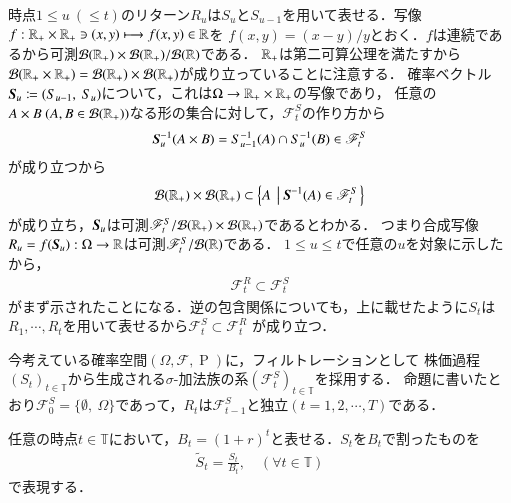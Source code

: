 \begin{prf}
	時点$1 \leq u\ (\leq t)$のリターン$R_u$は$S_u$と$S_{u-1}$を用いて表せる．写像$f: \mathbb{R}_+ \times \mathbb{R}_+ \ni (x,y) \longmapsto f(x,y) \in \mathbb{R}$を
	$f(x,y) = (x-y) / y$とおく．$f$は連続であるから可測$\mathcal{B}(\mathbb{R}_+) \times \mathcal{B}(\mathbb{R}_+)/\mathcal{B}(\mathbb{R})$である．
	$\mathbb{R}_+$は第二可算公理を満たすから$\mathcal{B}(\mathbb{R}_+ \times \mathbb{R}_+) = \mathcal{B}(\mathbb{R}_+) \times \mathcal{B}(\mathbb{R}_+)$が成り立っていることに注意する．
	確率ベクトル$\Vector{S}_u \coloneqq (S_{u-1},\ S_u)$について，これは$\Omega \rightarrow \mathbb{R}_+ \times \mathbb{R}_+$の写像であり，
	任意の$A \times B\ (A, B \in \mathcal{B}(\mathbb{R}_+))$なる形の集合に対して，$\mathscr{F}_t^S$の作り方から
	\begin{align}
		\mbox{\boldmath $S$}_u^{-1}(A \times B) = S_{u-1}^{-1}(A) \cap S_u^{-1}(B) \in \mathscr{F}_t^S
	\end{align}
	が成り立つから
	\begin{align}
		\borel{\R_+} \times \borel{\R_+} \subset \left\{A\ \left|\ \Vector{S}^{-1}(A) \in \mathscr{F}_t^S\right.\right\}
	\end{align}
	が成り立ち，$\mbox{\boldmath $S$}_u$は可測$\mathscr{F}_t^S/\mathcal{B}(\mathbb{R}_+) \times \mathcal{B}(\mathbb{R}_+)$であるとわかる．
	つまり合成写像$R_u = f(\mbox{\boldmath $S$}_u):\Omega \rightarrow \mathbb{R}$は可測$\mathscr{F}_t^S/\mathcal{B}(\mathbb{R})$である．
	$1 \leq u \leq t$で任意の$u$を対象に示したから，
	\begin{align}
		\mathscr{F}_t^R \subset \mathscr{F}_t^S
	\end{align}
	がまず示されたことになる．逆の包含関係についても，上に載せたように$S_t$は$R_1,\cdots,R_t$を用いて表せるから$\mathscr{F}_t^S \subset \mathscr{F}_t^R$
	が成り立つ．
	\QED
\end{prf}

\begin{asm}[フィルトレーション]
	今考えている確率空間$(\Omega, \mathscr{F}, \operatorname{P})$に，フィルトレーションとして
	株価過程$(S_t)_{t \in \mathbb{T}}$から生成される$\sigma$-加法族の系$(\mathscr{F}_t^S)_{t \in \mathbb{T}}$を採用する．
	命題に書いたとおり$\mathscr{F}_0^S = \{\emptyset,\ \Omega\}$であって，$R_t$は$\mathscr{F}_{t-1}^S$と独立$(t = 1,2,\cdots,T)$である．
\end{asm}

\begin{dfn}[割引過程]
	任意の時点$t \in \mathbb{T}$において，$B_t = (1 + r)^t$と表せる．$S_t$を$B_t$で割ったものを
	\begin{align}
		\tilde{S}_t = \frac{S_t}{B_t}, \quad (\forall t \in \mathbb{T})
	\end{align}
	で表現する．
\end{dfn}


